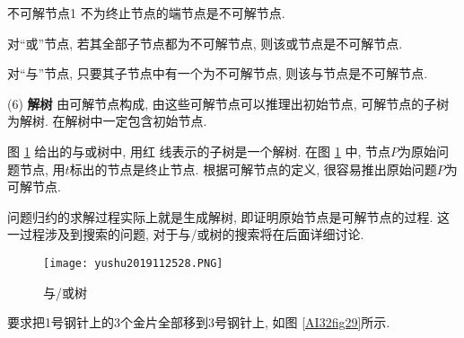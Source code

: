 \begin{mydef}{不可解节点}{1}
 不为终止节点的端节点是不可解节点.

 对“或”节点, 若其全部子节点都为不可解节点, 则该或节点是不可解节点.

 对“与”节点, 只要其子节点中有一个为不可解节点, 则该与节点是不可解节点.
\end{mydef}

(6) \textbf{解树} 由可解节点构成, 由这些可解节点可以推理出初始节点, 可解节点的子树为解树. 在解树中一定包含初始节点.
\begin{example}
    图 \ref{AI32fig28} 给出的与或树中, 用红 线表示的子树是一个解树. 在图 \ref{AI32fig28} 中, 节点$P$为原始问题节点, 用$t$标出的节点是终止节点. 根据可解节点的定义, 很容易推出原始问题$P$为可解节点.
\end{example}
\begin{remark}
    问题归约的求解过程实际上就是生成解树, 即证明原始节点是可解节点的过程. 这一过程涉及到搜索的问题, 对于与/或树的搜索将在后面详细讨论.
\end{remark}
\begin{figure}[H]
    \centering
    \texttt{[image: yushu2019112528.PNG]}
    \caption{与/或树 }
    \label{AI32fig28}
\end{figure}
\begin{example}
     要求把1号钢针上的3个金片全部移到3号钢针上, 如图 \ref{AI32fig29}所示.
\end{example}
